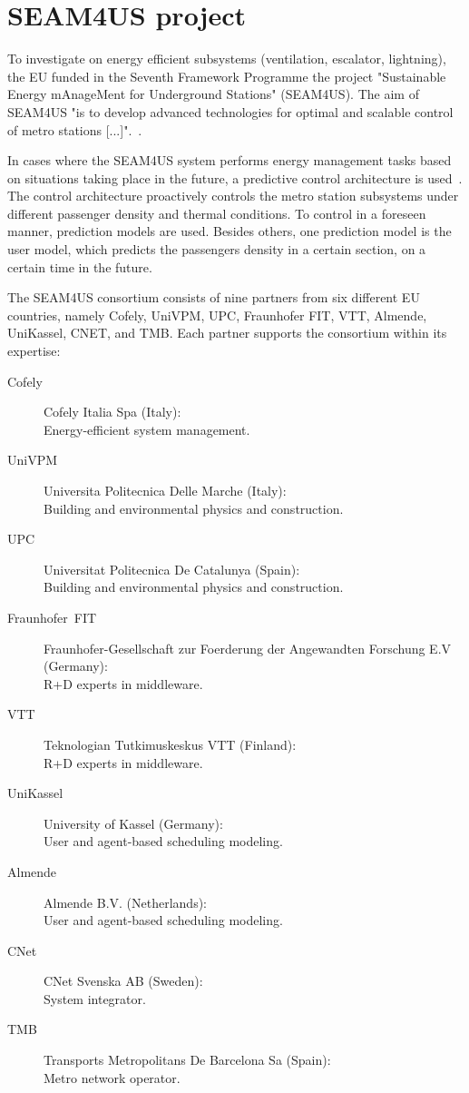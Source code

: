
\section{SEAM4US project}
\label{sec:seam4us}

To investigate on energy efficient subsystems (ventilation, escalator, lightning), the EU funded in the Seventh Framework Programme the project "Sustainable Energy mAnageMent for Underground Stations" (SEAM4US). The aim of SEAM4US "is to develop advanced technologies for optimal and scalable control of metro stations [...]".~\cite{SEAM4US_Website}.

In cases where the SEAM4US system performs energy management tasks based on situations taking place in the future, a predictive control architecture is used~\cite{ansuini_models_2013}. The control architecture proactively controls the metro station subsystems under different passenger density and thermal conditions.
To control in a foreseen manner, prediction models are used. Besides others, one prediction model is the user model, which predicts the passengers density in a certain section, on a certain time in the future.

The SEAM4US consortium consists of nine partners from six different EU countries, namely Cofely, UniVPM, UPC, Fraunhofer FIT, VTT, Almende, UniKassel, CNET, and TMB. Each partner supports the consortium within its expertise:

\begin{description}
  \item[Cofely] Cofely Italia Spa (Italy):\\Energy-efficient system management.
  \item[UniVPM] Universita Politecnica Delle Marche (Italy):\\Building and environmental physics and construction.
  \item[UPC] Universitat Politecnica De Catalunya (Spain):\\Building and environmental physics and construction.
  \item[Fraunhofer~FIT] Fraunhofer-Gesellschaft zur Foerderung der Angewandten Forschung E.V (Germany):\\R+D experts in middleware.
  \item[VTT] Teknologian Tutkimuskeskus VTT (Finland):\\R+D experts in middleware.
  \item[UniKassel] University of Kassel (Germany):\\User and agent-based scheduling modeling.
  \item[Almende] Almende B.V. (Netherlands):\\User and agent-based scheduling modeling.
  \item[CNet] CNet Svenska AB (Sweden):\\System integrator.
  \item[TMB] Transports Metropolitans De Barcelona Sa (Spain):\\Metro network operator.
\end{description}

